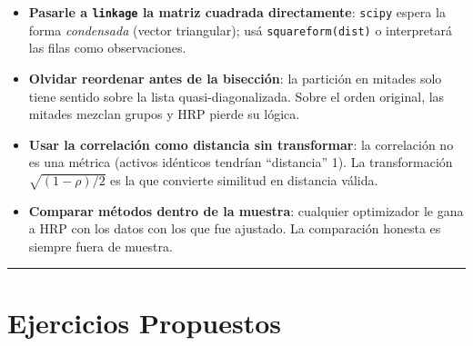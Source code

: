 \documentclass[
  spanish,
  letterpaper,
  DIV=11,
  numbers=noendperiod]{scrreprt}
\providecommand{\tightlist}{%
  \setlength{\itemsep}{0pt}\setlength{\parskip}{0pt}}
\begin{document}
\begin{tcolorbox}[enhanced jigsaw, bottomrule=.15mm, colback=white, opacitybacktitle=0.6, arc=.35mm, toprule=.15mm, opacityback=0, breakable, titlerule=0mm, left=2mm, coltitle=black, colbacktitle=quarto-callout-warning-color!10!white, colframe=quarto-callout-warning-color-frame, leftrule=.75mm, toptitle=1mm, bottomtitle=1mm, title=\textcolor{quarto-callout-warning-color}{\faExclamationTriangle}\hspace{0.5em}{Trampas frecuentes}, rightrule=.15mm]

\begin{itemize}
\tightlist
\item
  \textbf{Pasarle a \texttt{linkage} la matriz cuadrada directamente}:
  \texttt{scipy} espera la forma \emph{condensada} (vector triangular);
  usá \texttt{squareform(dist)} o interpretará las filas como
  observaciones.
\item
  \textbf{Olvidar reordenar antes de la bisección}: la partición en
  mitades solo tiene sentido sobre la lista quasi-diagonalizada. Sobre
  el orden original, las mitades mezclan grupos y HRP pierde su lógica.
\item
  \textbf{Usar la correlación como distancia sin transformar}: la
  correlación no es una métrica (activos idénticos tendrían
  ``distancia'' 1). La transformación \(\sqrt{(1-\rho)/2}\) es la que
  convierte similitud en distancia válida.
\item
  \textbf{Comparar métodos dentro de la muestra}: cualquier optimizador
  le gana a HRP con los datos con los que fue ajustado. La comparación
  honesta es siempre fuera de muestra.
\end{itemize}

\end{tcolorbox}

\begin{center}\rule{0.5\linewidth}{0.5pt}\end{center}

\chapter{Ejercicios Propuestos}\label{ejercicios-propuestos-8}
\end{document}
